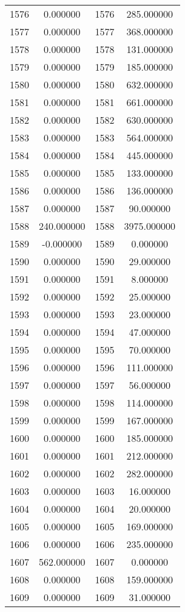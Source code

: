 \documentclass[12pt]{article}
\begin{document}
\begin{longtable}{@{}cccc@{}}
1576 & 0.000000 & 1576 & 285.000000 \\
1577 & 0.000000 & 1577 & 368.000000 \\
1578 & 0.000000 & 1578 & 131.000000 \\
1579 & 0.000000 & 1579 & 185.000000 \\
1580 & 0.000000 & 1580 & 632.000000 \\
1581 & 0.000000 & 1581 & 661.000000 \\
1582 & 0.000000 & 1582 & 630.000000 \\
1583 & 0.000000 & 1583 & 564.000000 \\
1584 & 0.000000 & 1584 & 445.000000 \\
1585 & 0.000000 & 1585 & 133.000000 \\
1586 & 0.000000 & 1586 & 136.000000 \\
1587 & 0.000000 & 1587 & 90.000000 \\
1588 & 240.000000 & 1588 & 3975.000000 \\
1589 & -0.000000 & 1589 & 0.000000 \\
1590 & 0.000000 & 1590 & 29.000000 \\
1591 & 0.000000 & 1591 & 8.000000 \\
1592 & 0.000000 & 1592 & 25.000000 \\
1593 & 0.000000 & 1593 & 23.000000 \\
1594 & 0.000000 & 1594 & 47.000000 \\
1595 & 0.000000 & 1595 & 70.000000 \\
1596 & 0.000000 & 1596 & 111.000000 \\
1597 & 0.000000 & 1597 & 56.000000 \\
1598 & 0.000000 & 1598 & 114.000000 \\
1599 & 0.000000 & 1599 & 167.000000 \\
1600 & 0.000000 & 1600 & 185.000000 \\
1601 & 0.000000 & 1601 & 212.000000 \\
1602 & 0.000000 & 1602 & 282.000000 \\
1603 & 0.000000 & 1603 & 16.000000 \\
1604 & 0.000000 & 1604 & 20.000000 \\
1605 & 0.000000 & 1605 & 169.000000 \\
1606 & 0.000000 & 1606 & 235.000000 \\
1607 & 562.000000 & 1607 & 0.000000 \\
1608 & 0.000000 & 1608 & 159.000000 \\
1609 & 0.000000 & 1609 & 31.000000 \\

\end{longtable}
\end{document}
